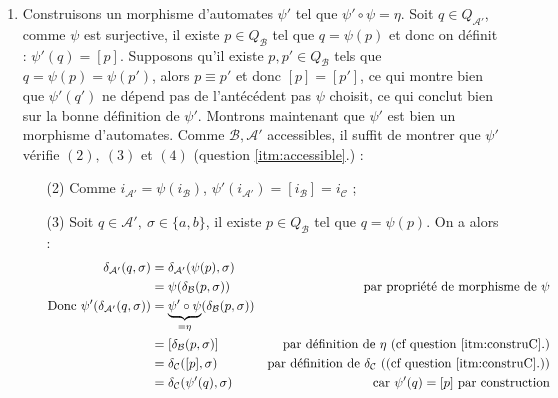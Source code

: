 \documentclass{article}
\begin{document}
\begin{enumerate}
    \item \label{itm:construMorphisme} Construisons un morphisme d'automates $\psi'$ tel que $\psi' \circ \psi = \eta$. \newline 
    Soit $q \in Q_\mathcal{A'}$, comme $\psi$ est surjective, il existe $p \in Q_\mathcal{B}$ tel que $q = \psi(p)$ et donc on définit : $\psi'(q) = [p]$. Supposons qu'il existe $p, p' \in  Q_\mathcal{B}$ tels que $q = \psi(p) = \psi(p')$, alors $p \equiv p'$ et donc $[p] = [p']$, ce qui montre bien que $\psi'(q')$ ne dépend pas de l'antécédent pas $\psi$ choisit, ce qui conclut bien sur la bonne définition de $\psi'$. \newline 
    Montrons maintenant que $\psi'$ est bien un morphisme d'automates. Comme $\mathcal{B}, \mathcal{A'}$ accessibles, il suffit de montrer que $\psi'$ vérifie $(2), \:(3)$ et $(4)$ (question \ref{itm:accessible}.) : 
    \begin{itemize}
        \item[(2)] Comme $i_\mathcal{A'} = \psi(i_\mathcal{B})$, $\psi'(i_\mathcal{A'}) = [i_\mathcal{B}] = i_\mathcal{C}$ ;

        \item[(3)] Soit $q \in \mathcal{A'}, \: \sigma \in \{a, b\}$, il existe $p \in Q_\mathcal{B}$ tel que $q = \psi(p)$. On a alors :
            \begin{align*}
                \delta_\mathcal{A'}(q, \sigma) &= \delta_\mathcal{A'}(\psi(p), \sigma)  & \\
                &= \psi(\delta_\mathcal{B}(p, \sigma)) & \text{par propriété de morphisme de $\psi$} \\
                \text{Donc } \psi'(\delta_\mathcal{A'}(q, \sigma)) &= \underbrace{\psi' \circ \psi}_{= \eta}(\delta_\mathcal{B}(p, \sigma)) & \\
                &= [\delta_\mathcal{B}(p, \sigma)] & \text{par définition de $\eta$ (cf question \ref{itm:construC}.)} \\
                &= \delta_\mathcal{C}([p], \sigma) & \text{par définition de $\delta_\mathcal{C}$ ((cf question \ref{itm:construC}.))} \\
                &= \delta_\mathcal{C}(\psi'(q), \sigma) & \text{car $\psi'(q) = [p]$ par construction}
            \end{align*}


\end{itemize}
\end{enumerate}
\end{document}
